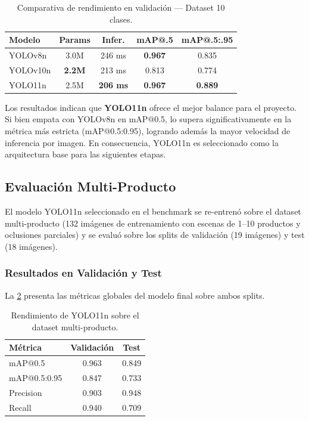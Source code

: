 \documentclass[conference,a4paper]{IEEEtran}[2015/08/26]
\begin{document}
\begin{table}[htbp]
\centering
\caption{Comparativa de rendimiento en validación --- Dataset 10 clases.}
\label{tab:resultados-benchmark}
\small
\begin{tabular}{lcccc}
\hline
\textbf{Modelo} & \textbf{Params} & \textbf{Infer.} & \textbf{mAP@.5} & \textbf{mAP@.5:.95} \\
\hline
YOLOv8n  & 3.0M & 246 ms & \textbf{0.967} & 0.835 \\
YOLOv10n & \textbf{2.2M} & 213 ms & 0.813 & 0.774 \\
YOLO11n  & 2.5M & \textbf{206 ms} & \textbf{0.967} & \textbf{0.889} \\
\hline
\end{tabular}
\end{table}

Los resultados indican que \textbf{YOLO11n} ofrece el mejor balance para el proyecto. Si bien empata con YOLOv8n en mAP@0.5, lo supera significativamente en la métrica más estricta (mAP@0.5:0.95), logrando además la mayor velocidad de inferencia por imagen. En consecuencia, YOLO11n es seleccionado como la arquitectura base para las siguientes etapas.

\subsection{Evaluación Multi-Producto}
\label{subsec:eval-multiproducto}

El modelo YOLO11n seleccionado en el benchmark se re-entrenó sobre el dataset multi-producto (132 imágenes de entrenamiento con escenas de 1--10 productos y oclusiones parciales) y se evaluó sobre los splits de validación (19 imágenes) y test (18 imágenes).

\subsubsection{Resultados en Validación y Test}

La \cref{tab:resultados-multiproducto} presenta las métricas globales del modelo final sobre ambos splits.

\begin{table}[htbp]
\centering
\caption{Rendimiento de YOLO11n sobre el dataset multi-producto.}
\label{tab:resultados-multiproducto}
\begin{tabular}{lcc}
\hline
\textbf{Métrica} & \textbf{Validación} & \textbf{Test} \\
\hline
mAP@0.5          & 0.963 & 0.849 \\
mAP@0.5:0.95     & 0.847 & 0.733 \\
Precision        & 0.903 & 0.948 \\
Recall           & 0.940 & 0.709 \\
\hline
\end{tabular}
\end{table}
\end{document}
